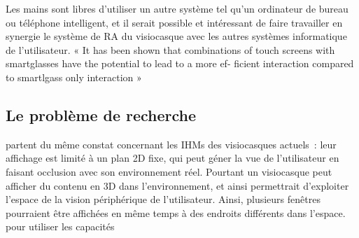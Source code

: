 Les mains sont libres d'utiliser un autre système tel qu'un ordinateur de bureau ou téléphone intelligent, et il serait possible et intéressant de faire travailler en synergie le système de RA du visiocasque avec les autres systèmes informatique de l'utilisateur. \citep{SerranoEnsYangEtAl2015a} \citep{SerranoEnsYangEtAl2015}
« It has been shown that combinations of touch screens
with smartglasses have the potential to lead to a more ef-
ficient interaction compared to smartlgass only interaction » \cite{GrubertKranzQuigley2015}


\subsection*{Le problème de recherche}

\citet{ChanKaoChenEtAl2010} partent du même constat concernant les IHMs des visiocasques actuels~: leur affichage est limité à un plan 2D fixe, qui peut géner la vue de l'utilisateur en faisant occlusion avec son environnement réel. Pourtant un visiocasque peut afficher du contenu en 3D dans l'environnement, et ainsi permettrait d'exploiter l'espace de la vision périphérique de l'utilisateur. Ainsi, plusieurs fenêtres pourraient être affichées en même temps à des endroits différents dans l'espace.  pour utiliser les capacités





